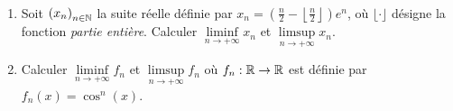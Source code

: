 \begin{td-exo}\, %
    \begin{enumerate}
        \item Soit \({(x_n)}_{n\in\mathbb{N}}\) 
        la suite réelle définie par \(x_n=\left(\frac{n}{2}-\left\lfloor\frac{n}{2}\right\rfloor\right)e^n\), 
        où \(\lfloor \cdot\rfloor\) désigne la fonction \emph{partie entière}. 
        Calculer \(\liminf\limits_{n\to+\infty} x_n\) et \(\limsup\limits_{n\to+\infty} x_n\).
        \item Calculer \(\liminf\limits_{n\to+\infty} f_n\) et \(\limsup\limits_{n\to+\infty} f_n\) 
        où \(f_n:\mathbb{R}\to\mathbb{R}\) est définie par \(f_n(x)=\cos^n(x)\).

    \end{enumerate}

    \begin{center}
        
    \end{center}
\end{td-exo}

